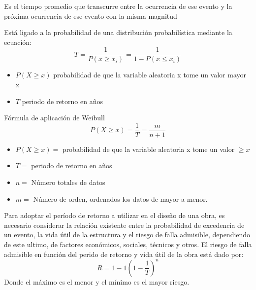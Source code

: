     \begin{definition}
        Es el tiempo promedio que transcurre entre la ocurrencia de ese evento y la próxima ocurrencia de ese evento con la misma magnitud
    \end{definition}
    Está ligado a la probabilidad de una distribución probabilística mediante la ecuación:
    \begin{equation}
        T = \frac{1}{P(x\geq x_i)} =\frac{1}{1 -P(x\leq x_i)}
    \end{equation}
    \begin{notation}
        \begin{itemize}
            \item $P(X\geq x)$ probabilidad de que la variable aleatoria x tome un valor mayor x
            \item $T$ periodo de retorno en años
        \end{itemize}
    \end{notation}
    Fórmula de aplicación de Weibull
    \begin{equation}
        P(X\geq x) = \frac{1}{T} = \frac{m}{n +1}
    \end{equation}
    \begin{notation}
        \begin{itemize}
            \item $P(X\geq x)=$ probabilidad de que la variable aleatoria x tome un valor $\geq x$
            \item $T=$ periodo de retorno en años
            \item $n=$ Número totales de datos
            \item $m=$ Número de orden, ordenados los datos de mayor a menor.
        \end{itemize}
    \end{notation}
    Para adoptar el período de retorno a utilizar en el diseño de una obra, es necesario considerar la relación existente entre la probabilidad de excedencia de un evento, la vida útil de la estructura y el riesgo de falla admisible, dependiendo de este ultimo, de factores económicos, sociales, técnicos y otros. El riesgo de falla admisible en función del perido de retorno y vida útil de la obra está dado por:
    \begin{equation}
        R = 1 - 1\left(1 - \frac{1}{T}\right)^n
    \end{equation}
    Donde el máximo es el menor y el mínimo es el mayor riesgo.
    
